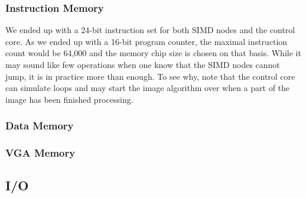 \subsubsection*{Instruction Memory}

We ended up with a 24-bit instruction set for both \ac{SIMD} nodes and the
control core. As we ended up with a 16-bit program counter, the maximal
instruction count would be 64,000 and the memory chip size is chosen on that
basis. While it may sound like few operations when one know that the \ac{SIMD}
nodes cannot jump, it is in practice more than enough. To see why, note that the
control core can simulate loops and may start the image algorithm over when a
part of the image has been finished processing.

\subsubsection*{Data Memory}

\subsubsection*{VGA Memory}

\subsection{I/O}

